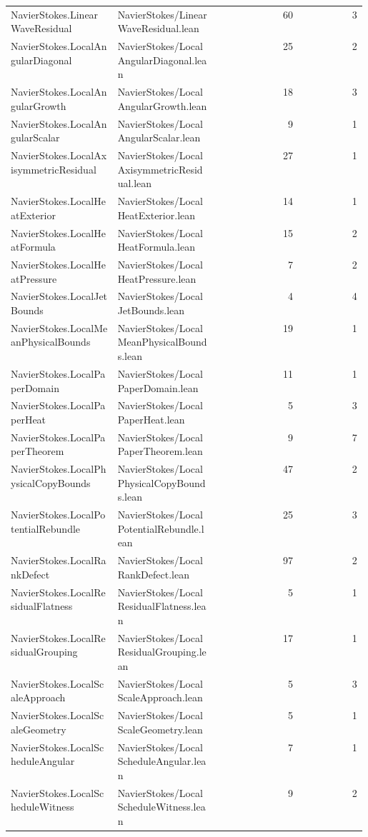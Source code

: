 \begin{longtable}{p{0.30\linewidth}p{0.28\linewidth}rr}
NavierStokes.LinearWaveResidual & NavierStokes/LinearWaveResidual.lean & 60 & 3\\
NavierStokes.LocalAngularDiagonal & NavierStokes/LocalAngularDiagonal.lean & 25 & 2\\
NavierStokes.LocalAngularGrowth & NavierStokes/LocalAngularGrowth.lean & 18 & 3\\
NavierStokes.LocalAngularScalar & NavierStokes/LocalAngularScalar.lean & 9 & 1\\
NavierStokes.LocalAxisymmetricResidual & NavierStokes/LocalAxisymmetricResidual.lean & 27 & 1\\
NavierStokes.LocalHeatExterior & NavierStokes/LocalHeatExterior.lean & 14 & 1\\
NavierStokes.LocalHeatFormula & NavierStokes/LocalHeatFormula.lean & 15 & 2\\
NavierStokes.LocalHeatPressure & NavierStokes/LocalHeatPressure.lean & 7 & 2\\
NavierStokes.LocalJetBounds & NavierStokes/LocalJetBounds.lean & 4 & 4\\
NavierStokes.LocalMeanPhysicalBounds & NavierStokes/LocalMeanPhysicalBounds.lean & 19 & 1\\
NavierStokes.LocalPaperDomain & NavierStokes/LocalPaperDomain.lean & 11 & 1\\
NavierStokes.LocalPaperHeat & NavierStokes/LocalPaperHeat.lean & 5 & 3\\
NavierStokes.LocalPaperTheorem & NavierStokes/LocalPaperTheorem.lean & 9 & 7\\
NavierStokes.LocalPhysicalCopyBounds & NavierStokes/LocalPhysicalCopyBounds.lean & 47 & 2\\
NavierStokes.LocalPotentialRebundle & NavierStokes/LocalPotentialRebundle.lean & 25 & 3\\
NavierStokes.LocalRankDefect & NavierStokes/LocalRankDefect.lean & 97 & 2\\
NavierStokes.LocalResidualFlatness & NavierStokes/LocalResidualFlatness.lean & 5 & 1\\
NavierStokes.LocalResidualGrouping & NavierStokes/LocalResidualGrouping.lean & 17 & 1\\
NavierStokes.LocalScaleApproach & NavierStokes/LocalScaleApproach.lean & 5 & 3\\
NavierStokes.LocalScaleGeometry & NavierStokes/LocalScaleGeometry.lean & 5 & 1\\
NavierStokes.LocalScheduleAngular & NavierStokes/LocalScheduleAngular.lean & 7 & 1\\
NavierStokes.LocalScheduleWitness & NavierStokes/LocalScheduleWitness.lean & 9 & 2\\

\end{longtable}
